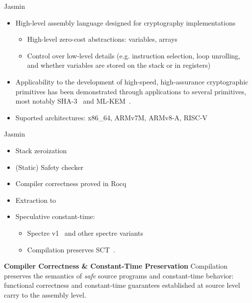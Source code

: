 \begin{frame}{Jasmin~\cite{CCS:ABBBGL17,SP:ABBGKL20}}

  \begin{itemize}
      \setlength{\itemsep}{4mm}
    \item High-level assembly language designed for cryptography implementations
      \begin{itemize}
          \setlength{\itemsep}{1mm}
        \item High-level zero-cost abstractions: variables, arrays
        \item Control over low-level details (e.g. instruction
            selection, loop unrolling,
          and whether variables are stored on the stack or in registers)
      \end{itemize}
    \item Applicability to the development of high-speed, high-assurance
      cryptographic primitives has been demonstrated through applications to
      several primitives, most notably SHA-3~\cite{CCS:ABBBDG19}
      and ML-KEM~\cite{C:AOBBDG24,TCHES:ABBGLL23}.
    \item Suported architectures: x86\_64, ARMv7M, ARMv8-A, RISC-V
  \end{itemize}

\end{frame}

\begin{frame}{Jasmin~\cite{CCS:ABBBGL17,SP:ABBGKL20}}

  \begin{itemize}
      \setlength{\itemsep}{2mm}
    \item Stack zeroization~\cite{TCHES:OBGGLL24}
    \item (Static) Safety checker
    \item Compiler correctness proved in Rocq
    \item Extraction to \EasyCrypt
    \item Speculative constant-time:
    \begin{itemize}\setlength{\itemsep}{1mm}
        \item Spectre v1~\cite{SP:SBGLOP23} and other spectre
          variants~\cite{DBLP:conf/asplos/OlmosBCGL0SY025}
        \item Compilation preserves SCT~\cite{DBLP:journals/pacmpl/OlmosBBGL25}.
      \end{itemize}
  \end{itemize}

  \vspace{2mm}
  \begin{block}{\textbf{Compiler Correctness \& Constant-Time Preservation}}
    Compilation preserves the semantics of \emph{safe} source
    programs and constant-time behavior:
    functional correctness and constant-time guarantees established
    at source level carry to the assembly level.
  \end{block}
\end{frame}
